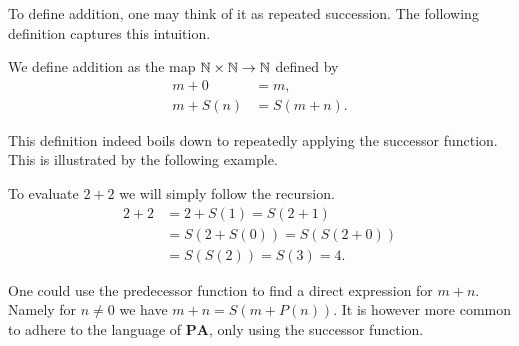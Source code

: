 \documentclass[../main.tex]{subfiles}
\begin{document}
To define addition, one may think of it as repeated succession. The following definition captures this intuition.
\begin{definition}
    We define addition as the map $\mathbb{N}\times\mathbb{N}\to\mathbb{N}$ defined by
    \begin{align*}
        m+0 & =m, \\
        m+S(n) & =S(m+n).
    \end{align*}
\end{definition}
This definition indeed boils down to repeatedly applying the successor function. This is illustrated by the following example.
\begin{example}
    To evaluate $2+2$ we will simply follow the recursion.
    \begin{align*}
        2+2 & =2+S(1)=S(2+1) \\
        & =S(2+S(0))=S(S(2+0)) \\
        & =S(S(2))=S(3)=4.
    \end{align*}
\end{example}
One could use the predecessor function to find a direct expression for $m+n$. Namely for $n\neq0$ we have $m+n=S(m+P(n))$. It is however more common to adhere to the language of $\mathbf{PA}$, only using the successor function.
\end{document}

